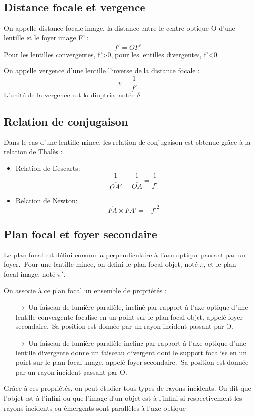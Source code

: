 \subsection{Distance focale et vergence}

\begin{de}
On appelle distance focale image, la distance entre le centre optique O d'une lentille et le foyer image F' :
$$f' = \overline{OF'}$$
Pour les lentilles convergentes, f'>0, pour les lentilles divergentes, f'<0
\end{de}

\begin{de}
On appelle vergence d'une lentille l'inverse de la distance focale :
$$v = \dfrac{1}{f'}$$
L'unité de la vergence est la dioptrie, notée $\delta$
\end{de}

\subsection{Relation de conjugaison}

Dans le cas d'une lentille mince, les relation de conjugaison est obtenue grâce à la relation de Thalès :
\begin{itemize}
  \item Relation de Descarts:
    $$\dfrac{1}{\overline{OA'}} - \dfrac{1}{\overline{OA}} = \dfrac{1}{f'}$$
  \item Relation de Newton:
    $$\overline{FA} \times \overline{FA'} = - f'^2$$
\end{itemize}

\subsection{Plan focal et foyer secondaire}

\begin{de}
Le plan focal est défini comme la perpendiculaire à l'axe optique passant par un foyer.\
Pour une lentille mince, on défini le plan focal objet, noté $\pi$, et le plan focal image, noté $\pi'$. 
\end{de}

On associe à ce plan focal un ensemble de propriétés : 
\begin{itemize}
 \item[$\rightarrow$] Un faiseau de lumière parallèle, incliné par rapport à l'axe optique d'une lentille convergente focalise en un point sur le plan focal objet, appelé foyer secondaire.\
Sa position est donnée par un rayon incident passant par O.
\item[$\rightarrow$] Un faiseau de lumière parallèle incliné par rapport à l'axe optique d'une lentille divergente donne un faisceau divergent dont le support focalise en un point sur le plan focal image, appelé foyer secondaire.\
Sa position est donnée par un rayon incident passant par O.
\end{itemize}
Grâce à ces propriétés, on peut étudier tous types de rayons incidents. On dit que l'objet est à l'infini ou que l'image d'un objet est à l'infini si respectivement les rayons incidents ou émergents sont parallèles à l'axe optique

